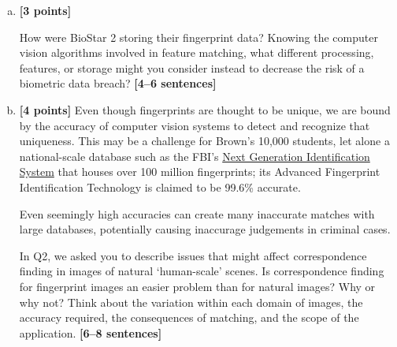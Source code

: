 \documentclass[11pt]{article}
\begin{document}
\begin{enumerate}[(a)]
    \item \textbf{[3 points]}
    \begin{tcolorbox}[colback=orange!5!white,colframe=orange!75!black]
    How were BioStar 2 storing their fingerprint data? Knowing the computer vision algorithms involved in feature matching, what different processing, features, or storage might you consider instead to decrease the risk of a biometric data breach? \textbf{[4--6 sentences]}
    \end{tcolorbox}


    \pagebreak
    \item 
    \textbf{[4 points]}
Even though fingerprints are thought to be unique, we are bound by the accuracy of computer vision systems to detect and recognize that uniqueness.
This may be a challenge for Brown's 10,000 students, let alone a national-scale database such as the FBI's \href{https://www.fbi.gov/services/cjis/fingerprints-and-other-biometrics/ngi}{Next Generation Identification System} that houses over 100 million fingerprints; its Advanced Fingerprint Identification Technology is claimed to be 99.6\% accurate.

Even seemingly high accuracies can create many inaccurate matches with large databases, potentially causing inaccurage judgements in criminal cases. 

    \begin{tcolorbox}[colback=orange!5!white,colframe=orange!75!black]
    In Q2, we asked you to describe issues that might affect correspondence finding in images of natural `human-scale' scenes. Is correspondence finding for fingerprint images an easier problem than for natural images? Why or why not? Think about the variation within each domain of images, the accuracy required, the consequences of matching, and the scope of the application. \textbf{[6--8 sentences]}


\end{tcolorbox}
\end{enumerate}
\end{document}
